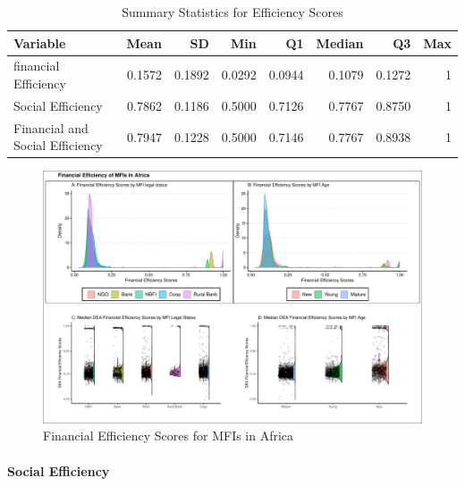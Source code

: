 \documentclass[
]{article}
\begin{document}
\begin{table}

\caption{\label{tab:unnamed-chunk-20}Summary Statistics for Efficiency Scores}
\centering
\fontsize{10}{12}\selectfont
\begin{tabular}[t]{lrrrrrrr}
\toprule
Variable & Mean & SD & Min & Q1 & Median & Q3 & Max\\
\midrule
financial Efficiency & 0.1572 & 0.1892 & 0.0292 & 0.0944 & 0.1079 & 0.1272 & 1\\
Social Efficiency & 0.7862 & 0.1186 & 0.5000 & 0.7126 & 0.7767 & 0.8750 & 1\\
Financial and Social Efficiency & 0.7947 & 0.1228 & 0.5000 & 0.7146 & 0.7767 & 0.8938 & 1\\
\bottomrule
\end{tabular}
\end{table}

\begin{landscape}

\newpage

\begin{figure}
\centering
\includegraphics{finsoc_efficiency_files/figure-latex/unnamed-chunk-21-1.pdf}
\caption{Financial Efficiency Scores for MFIs in Africa}
\end{figure}

\end{landscape}

\newpage

\hypertarget{social-efficiency-1}{%
\paragraph{Social Efficiency}\label{social-efficiency-1}}
\end{document}
